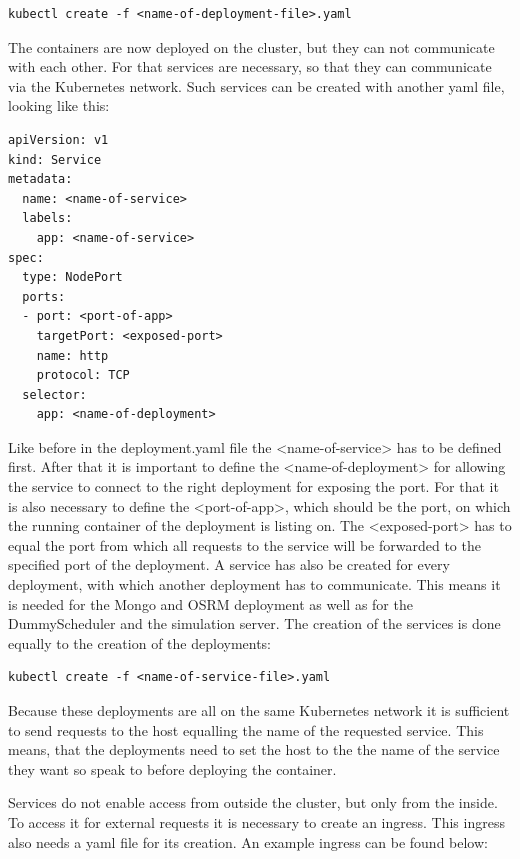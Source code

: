 \begin{lstlisting}
kubectl create -f <name-of-deployment-file>.yaml
\end{lstlisting}

The containers are now deployed on the cluster, but they can not communicate with each other. For that services are necessary, so that they can communicate via the Kubernetes network. Such services can be created with another yaml file, looking like this:

\begin{lstlisting}
apiVersion: v1
kind: Service
metadata:
  name: <name-of-service>
  labels:
    app: <name-of-service>
spec:
  type: NodePort
  ports:
  - port: <port-of-app>
    targetPort: <exposed-port>
    name: http
    protocol: TCP
  selector:
    app: <name-of-deployment>
\end{lstlisting}

Like before in the deployment.yaml file the <name-of-service> has to be defined first. After that it is important to define the <name-of-deployment> for allowing the service to connect to the right deployment for exposing the port. For that it is also necessary to define the <port-of-app>, which should be the port, on which the running container of the deployment is listing on. The <exposed-port> has to equal the port from which all requests to the service will be forwarded to the specified port of the deployment. A service has also be created for every deployment, with which another deployment has to communicate. This means it is needed for the Mongo and OSRM deployment as well as for the DummyScheduler and the simulation server. The creation of the services is done equally to the creation of the deployments:

\begin{lstlisting}
kubectl create -f <name-of-service-file>.yaml
\end{lstlisting}

Because these deployments are all on the same Kubernetes network it is sufficient to send requests to the host equalling the name of the requested service. This means, that the deployments need to set the host to the the name of the service they want so speak to before deploying the container.

Services do not enable access from outside the cluster, but only from the inside. To access it for external requests it is necessary to create an ingress. This ingress also needs a yaml file for its creation. An example ingress can be found below:

